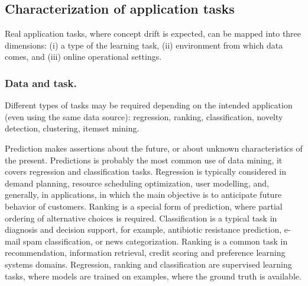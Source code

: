 \documentclass{llncs}
\begin{document}
\subsection{Characterization of application tasks}


Real application tasks, where concept drift is expected, %
can be mapped into three dimensions:
(i) a type of the learning task,
(ii) environment from which data comes,
and (iii) online operational settings.

\subsubsection{Data and task.}
Different types of tasks may be required depending on the intended application (even using the same data source): regression, ranking, classification, novelty detection, clustering, itemset mining.

Prediction makes assertions about the future, or about unknown characteristics of the present. Predictions is probably the most common use of data mining, it covers regression and classification tasks.
Regression is typically considered in demand planning, resource scheduling optimization, user modelling, and, generally, in applications, in which the main objective is to anticipate future behavior of customers. Ranking is a special form of prediction, where partial ordering of alternative choices is required.
Classification is a typical task in diagnosis and decision support, for example, antibiotic resistance prediction, e-mail spam classification, or news categorization.
Ranking is a common task in recommendation, information retrieval, credit scoring and preference learning systems domains.
Regression, ranking and classification are supervised learning tasks, where models are trained on examples, where the ground truth is available.
\end{document}
